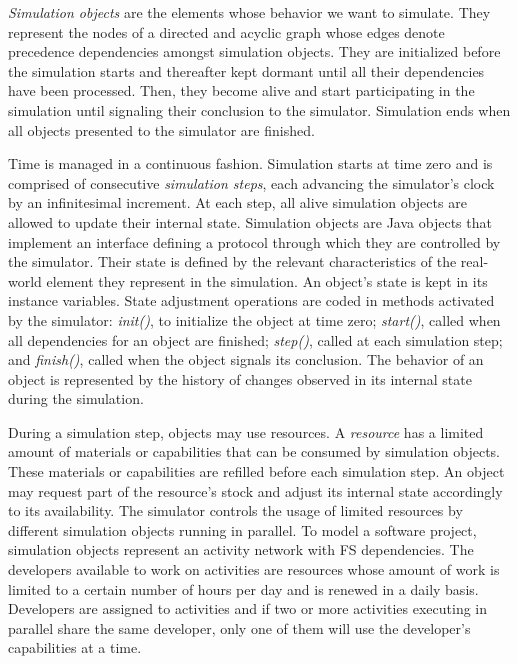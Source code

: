 \documentclass[conference]{IEEEtran}
\begin{document}
{\it Simulation objects} are the elements whose behavior we want to simulate. They represent the nodes of a directed and acyclic graph whose edges denote precedence dependencies amongst simulation objects. They are initialized before the simulation starts and thereafter kept dormant until all their dependencies have been processed. Then, they become alive and start participating in the simulation until signaling their conclusion to the simulator. Simulation ends when all objects presented to the simulator are finished.

Time is managed in a continuous fashion. Simulation starts at time zero and is comprised of consecutive {\it simulation steps}, each advancing the simulator's clock by an infinitesimal increment. At each step, all alive simulation objects are allowed to update their internal state. Simulation objects are Java objects that implement an interface defining a protocol through which they are controlled by the simulator. Their state is defined by the relevant characteristics of the real-world element they represent in the simulation. An object's state is kept in its instance variables. State adjustment operations are coded in methods activated by the simulator: {\it init()}, to initialize the object at time zero; {\it start()}, called when all dependencies for an object are finished; {\it step()}, called at each simulation step; and {\it finish()}, called when the object signals its conclusion. The behavior of an object is represented by the history of changes observed in its internal state during the simulation.

During a simulation step, objects may use resources. A {\it resource} has a limited amount of materials or capabilities that can be consumed by simulation objects. These materials or capabilities are refilled before each simulation step. An object may request part of the resource's stock and adjust its internal state accordingly to its availability. The simulator controls the usage of limited resources by different simulation objects running in parallel. To model a software project, simulation objects represent an activity network with FS dependencies. The developers available to work on activities are resources whose amount of work is limited to a certain number of hours per day and is renewed in a daily basis. Developers are assigned to activities and if two or more activities executing in parallel share the same developer, only one of them will use the developer's capabilities at a time.
\end{document}
